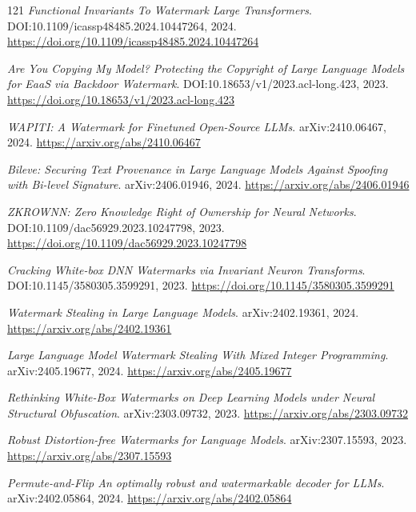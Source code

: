 \documentclass[11pt,a4paper]{article}
\begin{document}
\begin{thebibliography}{121}
\newblock \emph{Functional Invariants To Watermark Large Transformers}.
\newblock DOI:10.1109/icassp48485.2024.10447264, 2024.
\newblock \url{https://doi.org/10.1109/icassp48485.2024.10447264}

\newblock \emph{Are You Copying My Model? Protecting the Copyright of Large Language Models for EaaS via Backdoor Watermark}.
\newblock DOI:10.18653/v1/2023.acl-long.423, 2023.
\newblock \url{https://doi.org/10.18653/v1/2023.acl-long.423}

\newblock \emph{WAPITI: A Watermark for Finetuned Open-Source LLMs}.
\newblock arXiv:2410.06467, 2024.
\newblock \url{https://arxiv.org/abs/2410.06467}

\newblock \emph{Bileve: Securing Text Provenance in Large Language Models Against Spoofing with Bi-level Signature}.
\newblock arXiv:2406.01946, 2024.
\newblock \url{https://arxiv.org/abs/2406.01946}

\newblock \emph{ZKROWNN: Zero Knowledge Right of Ownership for Neural Networks}.
\newblock DOI:10.1109/dac56929.2023.10247798, 2023.
\newblock \url{https://doi.org/10.1109/dac56929.2023.10247798}

\newblock \emph{Cracking White-box DNN Watermarks via Invariant Neuron Transforms}.
\newblock DOI:10.1145/3580305.3599291, 2023.
\newblock \url{https://doi.org/10.1145/3580305.3599291}

\newblock \emph{Watermark Stealing in Large Language Models}.
\newblock arXiv:2402.19361, 2024.
\newblock \url{https://arxiv.org/abs/2402.19361}

\newblock \emph{Large Language Model Watermark Stealing With Mixed Integer Programming}.
\newblock arXiv:2405.19677, 2024.
\newblock \url{https://arxiv.org/abs/2405.19677}

\newblock \emph{Rethinking White-Box Watermarks on Deep Learning Models under Neural Structural Obfuscation}.
\newblock arXiv:2303.09732, 2023.
\newblock \url{https://arxiv.org/abs/2303.09732}

\newblock \emph{Robust Distortion-free Watermarks for Language Models}.
\newblock arXiv:2307.15593, 2023.
\newblock \url{https://arxiv.org/abs/2307.15593}

\newblock \emph{Permute-and-Flip An optimally robust and watermarkable decoder for LLMs}.
\newblock arXiv:2402.05864, 2024.
\newblock \url{https://arxiv.org/abs/2402.05864}


\end{thebibliography}
\end{document}

